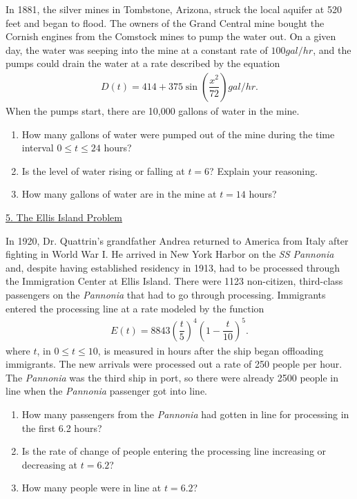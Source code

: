 In 1881, the silver mines in Tombstone, Arizona, struck the local aquifer at 520 feet and began to flood. The owners of the Grand Central mine bought the Cornish engines from the Comstock mines to pump the water out. On a given day, the water was seeping into the mine at a constant rate of $100 \si{gal \per hr}$, and the pumps could drain the water at a rate described by the equation \begin{align*}
    D(t) = 414 + 375\sin \left(\dfrac{x^2}{72}\right) \si{gal \per hr}.
\end{align*}
When the pumps start, there are 10,000 gallons of water in the mine. \\
\begin{enumerate}[label=\hspace{11pt}(\alph*), align=left, leftmargin=*, labelsep=0.25em]
    \item How many gallons of water were pumped out of the mine during the time interval $0 \leq t \leq 24$ hours? 
    \item Is the level of water rising or falling at $t = 6$? Explain your reasoning. 
    \item How many gallons of water are in the mine at $t = 14$ hours?
\end{enumerate} \vspace{11pt}

\begin{center}
    \underline{5. The Ellis Island Problem}
\end{center}

In 1920, Dr. Quattrin's grandfather Andrea returned to America from Italy after fighting in World War I. He arrived in New York Harbor on the \textit{SS Pannonia} and, despite having established residency in 1913, had to be processed through the Immigration Center at Ellis Island. There were 1123 non-citizen, third-class passengers on the \textit{Pannonia} that had to go through processing. Immigrants entered the processing line at a rate modeled by the function \begin{align*}
    E(t) = 8843\left(\dfrac{t}{5}\right)^4\left(1 - \dfrac{t}{10}\right)^5.
\end{align*}
where $t$, in $0 \leq t \leq 10$, is measured in hours after the ship began offloading immigrants. The new arrivals were processed out a rate of 250 people per hour. The \textit{Pannonia} was the third ship in port, so there were already 2500 people in line when the \textit{Pannonia} passenger got into line. \\
\begin{enumerate}[label=\hspace{11pt}(\alph*), align=left, leftmargin=*, labelsep=0.25em]
    \item How many passengers from the \textit{Pannonia} had gotten in line for processing in the first 6.2 hours? 
    \item Is the rate of change of people entering the processing line increasing or decreasing at $t = 6.2$?
    \item How many people were in line at $t = 6.2$?
\end{enumerate} \vspace{11pt}


